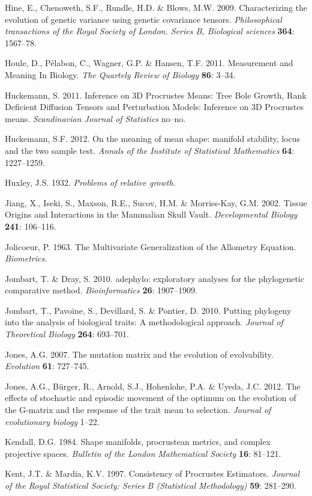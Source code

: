 \documentclass[12pt,twoside]{report}
\begin{document}
Hine, E., Chenoweth, S.F., Rundle, H.D. \& Blows, M.W. 2009.
Characterizing the evolution of genetic variance using genetic
covariance tensors. \emph{Philosophical transactions of the Royal
Society of London. Series B, Biological sciences} \textbf{364}:
1567--78.

Houle, D., Pélabon, C., Wagner, G.P. \& Hansen, T.F. 2011. Measurement
and Meaning In Biology. \emph{The Quartely Review of Biology}
\textbf{86}: 3--34.

Huckemann, S. 2011. Inference on 3D Procrustes Means: Tree Bole Growth,
Rank Deficient Diffusion Tensors and Perturbation Models: Inference on
3D Procrustes means. \emph{Scandinavian Journal of Statistics} no--no.

Huckemann, S.F. 2012. On the meaning of mean shape: manifold stability,
locus and the two sample test. \emph{Annals of the Institute of
Statistical Mathematics} \textbf{64}: 1227--1259.

Huxley, J.S. 1932. \emph{Problems of relative growth}.

Jiang, X., Iseki, S., Maxson, R.E., Sucov, H.M. \& Morriss-Kay, G.M.
2002. Tissue Origins and Interactions in the Mammalian Skull Vault.
\emph{Developmental Biology} \textbf{241}: 106--116.

Jolicoeur, P. 1963. The Multivariate Generalization of the Allometry
Equation. \emph{Biometrics}.

Jombart, T. \& Dray, S. 2010. adephylo: exploratory analyses for the
phylogenetic comparative method. \emph{Bioinformatics} \textbf{26}:
1907--1909.

Jombart, T., Pavoine, S., Devillard, S. \& Pontier, D. 2010. Putting
phylogeny into the analysis of biological traits: A methodological
approach. \emph{Journal of Theoretical Biology} \textbf{264}: 693--701.

Jones, A.G. 2007. The mutation matrix and the evolution of evolvability.
\emph{Evolution} \textbf{61}: 727--745.

Jones, A.G., Bürger, R., Arnold, S.J., Hohenlohe, P.A. \& Uyeda, J.C.
2012. The effects of stochastic and episodic movement of the optimum on
the evolution of the G-matrix and the response of the trait mean to
selection. \emph{Journal of evolutionary biology} 1--22.

Kendall, D.G. 1984. Shape manifolds, procrustean metrics, and complex
projective spaces. \emph{Bulletin of the London Mathematical Society}
\textbf{16}: 81--121.

Kent, J.T. \& Mardia, K.V. 1997. Consistency of Procrustes Estimators.
\emph{Journal of the Royal Statistical Society: Series B (Statistical
Methodology)} \textbf{59}: 281--290.
\end{document}
